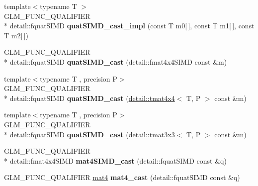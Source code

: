 \begin{DoxyCompactItemize}
\item 
\hypertarget{namespaceglm_a2e2bb4244525831b56079cdacc87948d}{{\footnotesize template$<$typename T $>$ }\\G\-L\-M\-\_\-\-F\-U\-N\-C\-\_\-\-Q\-U\-A\-L\-I\-F\-I\-E\-R \\*
detail\-::fquat\-S\-I\-M\-D {\bfseries quat\-S\-I\-M\-D\-\_\-cast\-\_\-impl} (const T m0\mbox{[}$\,$\mbox{]}, const T m1\mbox{[}$\,$\mbox{]}, const T m2\mbox{[}$\,$\mbox{]})}\label{namespaceglm_a2e2bb4244525831b56079cdacc87948d}

\item 
\hypertarget{namespaceglm_a0c09f4c773ffd14c3d9246a50011cf0c}{G\-L\-M\-\_\-\-F\-U\-N\-C\-\_\-\-Q\-U\-A\-L\-I\-F\-I\-E\-R \\*
detail\-::fquat\-S\-I\-M\-D {\bfseries quat\-S\-I\-M\-D\-\_\-cast} (detail\-::fmat4x4\-S\-I\-M\-D const \&m)}\label{namespaceglm_a0c09f4c773ffd14c3d9246a50011cf0c}

\item 
\hypertarget{namespaceglm_a9f05471745ec80855fe4d6559879ad64}{{\footnotesize template$<$typename T , precision P$>$ }\\G\-L\-M\-\_\-\-F\-U\-N\-C\-\_\-\-Q\-U\-A\-L\-I\-F\-I\-E\-R \\*
detail\-::fquat\-S\-I\-M\-D {\bfseries quat\-S\-I\-M\-D\-\_\-cast} (\hyperlink{structglm_1_1detail_1_1tmat4x4}{detail\-::tmat4x4}$<$ T, P $>$ const \&m)}\label{namespaceglm_a9f05471745ec80855fe4d6559879ad64}

\item 
\hypertarget{namespaceglm_ac9fd0f70546c3bf30a8aa72691877199}{{\footnotesize template$<$typename T , precision P$>$ }\\G\-L\-M\-\_\-\-F\-U\-N\-C\-\_\-\-Q\-U\-A\-L\-I\-F\-I\-E\-R \\*
detail\-::fquat\-S\-I\-M\-D {\bfseries quat\-S\-I\-M\-D\-\_\-cast} (\hyperlink{structglm_1_1detail_1_1tmat3x3}{detail\-::tmat3x3}$<$ T, P $>$ const \&m)}\label{namespaceglm_ac9fd0f70546c3bf30a8aa72691877199}

\item 
\hypertarget{namespaceglm_a0b2e5499072a338c1256735ecbf363ff}{G\-L\-M\-\_\-\-F\-U\-N\-C\-\_\-\-Q\-U\-A\-L\-I\-F\-I\-E\-R \\*
detail\-::fmat4x4\-S\-I\-M\-D {\bfseries mat4\-S\-I\-M\-D\-\_\-cast} (detail\-::fquat\-S\-I\-M\-D const \&q)}\label{namespaceglm_a0b2e5499072a338c1256735ecbf363ff}

\item 
\hypertarget{namespaceglm_a350adcfec63eb015dd2d9ee14a4e8cde}{G\-L\-M\-\_\-\-F\-U\-N\-C\-\_\-\-Q\-U\-A\-L\-I\-F\-I\-E\-R \hyperlink{group__core__types_ga7dcd2365c2e368e6af5b7adeb6a9c8df}{mat4} {\bfseries mat4\-\_\-cast} (detail\-::fquat\-S\-I\-M\-D const \&q)}\label{namespaceglm_a350adcfec63eb015dd2d9ee14a4e8cde}


\end{DoxyCompactItemize}
